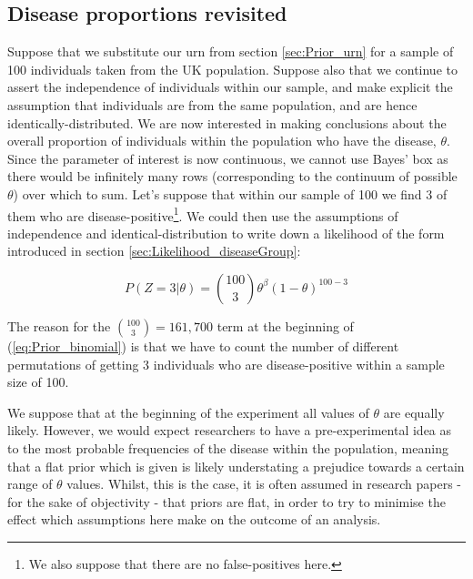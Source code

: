 \documentclass[11pt,fullpage]{book}
\begin{document}
\subsection{Disease proportions revisited}\label{sec:Prior_diseaseProp}
Suppose that we substitute our urn from section \ref{sec:Prior_urn} for a sample of 100 individuals taken from the UK population. Suppose also that we continue to assert the independence of individuals within our sample, and make explicit the assumption that individuals are from the same population, and are hence identically-distributed. We are now interested in making conclusions about the overall proportion of individuals within the population who have the disease, $\theta$. Since the parameter of interest is now continuous, we cannot use Bayes' box as there would be infinitely many rows (corresponding to the continuum of possible $\theta$) over which to sum. Let's suppose that within our sample of 100 we find 3 of them who are disease-positive\footnote{We also suppose that there are no false-positives here.}. We could then use the assumptions of independence and identical-distribution to write down a likelihood of the form introduced in section \ref{sec:Likelihood_diseaseGroup}:

\begin{equation}\label{eq:Prior_binomial}
P(Z=3|\theta) = {100 \choose 3} \theta^\beta (1-\theta)^{100-3}
\end{equation}

The reason for the ${100 \choose 3}=161,700$ term at the beginning of (\ref{eq:Prior_binomial}) is that we have to count the number of different permutations of getting 3 individuals who are disease-positive within a sample size of 100. 

We suppose that at the beginning of the experiment all values of $\theta$ are equally likely. However, we would expect researchers to have a pre-experimental idea as to the most probable frequencies of the disease within the population, meaning that a flat prior which is given is likely understating a prejudice towards a certain range of $\theta$ values. Whilst, this is the case, it is often assumed in research papers - for the sake of objectivity - that priors are flat, in order to try to minimise the effect which assumptions here make on the outcome of an analysis.
\end{document}
